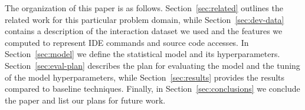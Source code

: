 The organization of this paper is as follows. Section~\ref{sec:related} outlines the related work for this particular problem domain, while Section~\ref{sec:dev-data} contains a description of the interaction dataset we used and the features we computed to represent IDE commands and source code accesses. In Section~\ref{sec:model} we define the statistical model and its hyperparameters. Section~\ref{sec:eval-plan} describes the plan for evaluating the model and the tuning of the model hyperparameters, while Section~\ref{sec:results} provides the results compared to baseline techniques. Finally, in Section~\ref{sec:conclusions} we conclude the paper and list our plans for future work.
